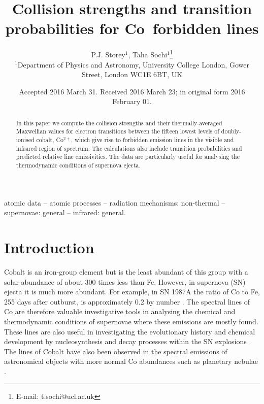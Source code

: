 \documentclass[useAMS,usenatbib]{mn2e}
\title[Atomic data for {\rm Co\III} forbidden lines]
{Collision strengths and transition probabilities for Co\III\ forbidden lines}
\author[P.J. Storey \& T. Sochi]
{P.J. Storey$^{1}$, Taha Sochi$^{1}$\thanks{E-mail: t.sochi@ucl.ac.uk} \\
$^{1}$Department of Physics and Astronomy, University College London, Gower Street, London WC1E
6BT, UK}
\begin{document}
\date{Accepted 2016 March 31. Received 2016 March 23; in original form 2016 February 01.  \vspace{0.3cm}}

\maketitle

\label{firstpage}

\begin{abstract}
In this paper we compute the collision strengths and their thermally-averaged Maxwellian values for
electron transitions between the fifteen lowest levels of doubly-ionised cobalt, Co$^{2+}$, which
give rise to forbidden emission lines in the visible and infrared region of spectrum. The
calculations also include transition probabilities and predicted relative line emissivities. The
data are particularly useful for analysing the thermodynamic conditions of supernova ejecta.
\vspace{0.3cm}
\end{abstract}

\begin{keywords}
atomic data -- atomic processes -- radiation mechanisms: non-thermal -- supernovae: general --
infrared: general. \vspace{0.4cm}
\end{keywords}

\section{Introduction} \label{Introduction}

Cobalt is an iron-group element but is the least abundant of this group with a solar abundance of
about 300 times less than Fe. However, in supernova (SN) ejecta it is much more abundant. For
example, in SN 1987A the ratio of Co to Fe, 255 days after outburst, is approximately 0.2 by number
\citep{VaraniMSA1990}. The spectral lines of Co are therefore valuable investigative tools in
analysing the chemical and thermodynamic conditions of supernovae where these emissions are mostly
found. These lines are also useful in investigating the evolutionary history and chemical
development by nucleosynthesis and decay processes within the SN explosions \citep{ColgateM1969,
AxelrodThesis1980, KuchnerKPL1994, BowersMGWPe1997, LiuJSQSP1997, ChurazovSIKJe2014,
ChildressHSSMe2015}. The lines of Cobalt have also been observed in the spectral emissions of
astronomical objects with more normal Co abundances such as planetary nebulae
\citep{BaluteauZMP1995, ZhangLLPB2005, PottaschS2005b, WangL2007, FangL2011}.
\end{document}
